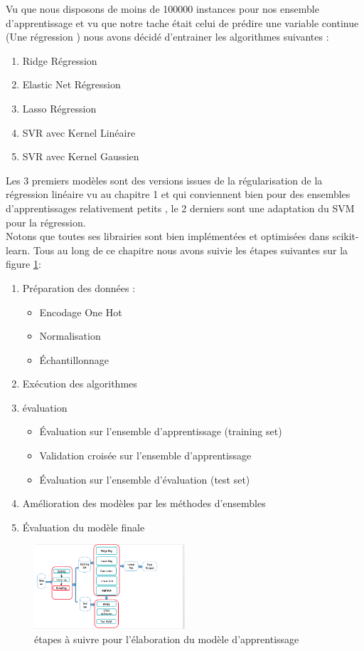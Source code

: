 Vu que nous disposons de moins de 100000 instances pour nos ensemble d'apprentissage et vu que notre tache était celui de prédire une variable continue (Une régression )  nous avons décidé d'entrainer les algorithmes  suivantes :
\begin{enumerate}
	\item Ridge Régression
	\item Elastic Net Régression
	\item Lasso Régression
	\item \ac{SVR} avec Kernel Linéaire
	\item  \ac{SVR} avec Kernel Gaussien 
\end{enumerate}
Les 3 premiers modèles sont des versions issues de la régularisation de la régression linéaire vu au chapitre 1  et qui conviennent bien pour des ensembles d'apprentissages relativement petits , le 2 derniers sont une adaptation du \ac{SVM} pour la régression.\\
Notons que toutes ses librairies sont bien implémentées et optimisées dans scikit-learn.
Tous au long de ce chapitre nous avons suivie les étapes suivantes  sur la figure \ref{fig:predictiveModelBuilding}:
 \begin{enumerate}
 \item Préparation des données :
 \begin{itemize}
 	\item  Encodage One Hot
 	\item  Normalisation
 	\item  Échantillonnage
 \end{itemize}
\item Exécution des algorithmes
\item évaluation 
   \begin{itemize}
  	\item  Évaluation sur l'ensemble d'apprentissage (training set)
  	\item  Validation croisée sur l'ensemble d'apprentissage
  	\item  Évaluation sur l'ensemble d'évaluation (test set) 
  \end{itemize}
\item Amélioration des modèles par les méthodes d'ensembles
\item Évaluation du modèle finale
 \end{enumerate}
\begin{figure}[ht]
	\centering
	\includegraphics[width=0.5\textwidth]{fig/ModelBuilding.png}
	\caption{étapes à suivre pour l'élaboration du modèle d'apprentissage }
	\label{fig:predictiveModelBuilding}
\end{figure} 
